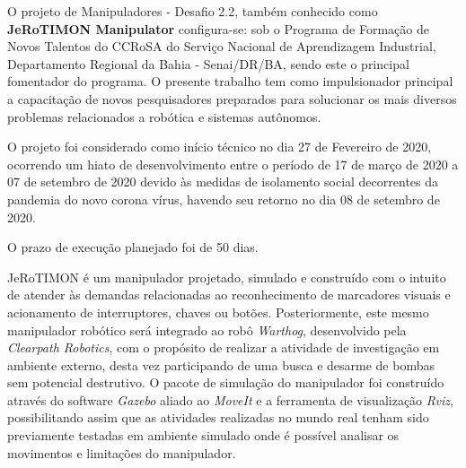 \documentclass[
12pt,					%
openright,				%
twoside,				%
a4paper,				%
english,
brazil
]{ABNT/abntex2_report}
\begin{document}
	\frenchspacing
	\imprimircapa
	\imprimircatalografica
	\ABNTEXchapterfont\large\textbf{\execsummarytitlename}
	\begin{flushleft}
		\normalsize
		\justify
		\normalfont
		O projeto de Manipuladores - Desafio 2.2, também conhecido como \textbf{JeRoTIMON Manipulator} configura-se: sob o Programa de Formação de Novos Talentos do \ac{CCRoSA} do Serviço Nacional de Aprendizagem Industrial, Departamento Regional da Bahia - Senai/DR/BA, sendo este o principal fomentador do programa.  O presente trabalho tem como impulsionador principal a capacitação de novos pesquisadores preparados para solucionar os mais diversos problemas relacionados a robótica e sistemas autônomos.

		O projeto foi considerado como início técnico no dia 27 de Fevereiro de 2020, ocorrendo um hiato de desenvolvimento entre o período de 17 de março de 2020 a 07 de setembro de 2020 devido às medidas de isolamento social decorrentes da pandemia do novo corona vírus, havendo seu retorno no dia 08 de setembro de 2020. 
		
		O prazo de execução planejado foi de 50 dias.
	\end{flushleft}
	\clearpage
	\ABNTEXchapterfont\large\textbf{\resumoatitlename}
	\begin{flushleft}
		\normalsize
		\justify
		\normalfont
		JeRoTIMON é um manipulador projetado, simulado e construído  com o intuito de atender às demandas relacionadas ao reconhecimento de marcadores visuais e acionamento de interruptores, chaves ou botões. Posteriormente, este mesmo manipulador robótico será integrado ao robô \textit{Warthog}, desenvolvido pela \textit{Clearpath Robotics},  com  o  propósito  de  realizar  a  atividade  de  investigação  em  ambiente  externo, desta vez participando de uma busca e desarme de bombas sem potencial destrutivo. O pacote de simulação do  manipulador foi  construído  através  do  software  \textit{Gazebo} aliado ao \textit{MoveIt} e a ferramenta de visualização \textit{Rviz}, possibilitando assim que as atividades  realizadas  no  mundo  real  tenham  sido previamente testadas em ambiente simulado onde é possível analisar os movimentos e limitações do manipulador. 

	\end{flushleft}
\end{document}
